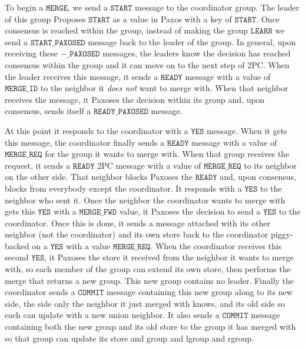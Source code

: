 \documentclass{amsart}
\theoremstyle{definition}
\theoremstyle{remark}
\numberwithin{equation}{section}
\begin{document}
To begin a $\mathtt{MERGE}$, we send a $\mathtt{START}$ message to the coordinator group. The leader of this group Proposes $\mathtt{START}$ as a value in Paxos with a key of $\mathtt{START}$. Once consensus is reached within the group, instead of making the group $\mathtt{LEARN}$ we send a $\mathtt{START\_PAXOSED}$ message back to the leader of the group. In general, upon receiving these $\mathtt{-\_PAXOSED}$ messages, the leaders know the decision has reached consensus within the group and it can move on to the next step of 2PC. When the leader receives this message, it sends a $\mathtt{READY}$ message with a value of $\mathtt{MERGE\_ID}$ to the neighbor it \textit{does not} want to merge with. When that neighbor receives the message, it Paxoses the decision within its group and, upon consensus, sends itself a $\mathtt{READY\_PAXOSED}$ message.
 
At this point it responds to the coordinator with a $\mathtt{YES}$ message. When it gets this message, the coordinator finally sends a $\mathtt{READY}$ message with a value of $\mathtt{MERGE\_REQ}$ for the group it wants to merge with. When that group receives the request, it sends a $\mathtt{READY}$ 2PC message with a value of $\mathtt{MERGE\_REQ}$ to its neighbor on the other side. That neighbor blocks Paxoses the $\mathtt{READY}$ and, upon consensus, blocks from everybody except the coordinator. It responds with a $\mathtt{YES}$ to the neighbor who sent it. Once the neighbor the coordinator wants to merge with gets this $\mathtt{YES}$ with a $\mathtt{MERGE\_FWD}$ value, it Paxoses the decision to send a $\mathtt{YES}$ to the coordinator. Once this is done, it sends a message attached with its other neighbor (not the coordinator) and its own store back to the coordinator piggy-backed on a $\mathtt{YES}$ with a value $\mathtt{MERGE\_REQ}$. When the coordinator receives this second $\mathtt{YES}$, it Paxoses the store it received from the neighbor it wants to merge with, so each member of the group can extend its own store, then performs the merge that returns a new group. This new group contains no leader. Finally the coordinator sends a $\mathtt{COMMIT}$ message containing this new group along to its new side, the side only the neighbor it just merged with knows, and its old side so each can update with a new union neighbor. It also sends a $\mathtt{COMMIT}$ message containing both the new group and its old store to the group it has merged with so that group can update its store and group and lgroup and rgroup. 
\end{document}
